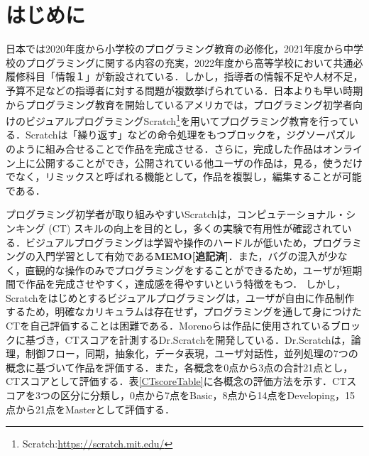 \documentclass[submit,techrep,noauthor]{ipsj}
\newcommand{\memo}[1]{\colorbox{magenta!30}{\textbf{MEMO}}{\color{red!50}\textbf{[#1]}}}
\begin{document}
\maketitle

\section{はじめに}

日本では2020年度から小学校のプログラミング教育の必修化，2021年度から中学校のプログラミングに関する内容の充実，2022年度から高等学校において共通必履修科目「情報１」が新設されている\cite{monkashou}．しかし，指導者の情報不足や人材不足，予算不足などの指導者に対する問題が複数挙げられている\cite{monkashou2}．日本よりも早い時期からプログラミング教育を開始しているアメリカでは，プログラミング初学者向けのビジュアルプログラミングScratch\footnote{Scratch:\url{https://scratch.mit.edu/}}\cite{resnick2009scratch}を用いてプログラミング教育を行っている．Scratchは「繰り返す」などの命令処理をもつブロックを，ジグソーパズルのように組み合せることで作品を完成させる．さらに，完成した作品はオンライン上に公開することができ，公開されている他ユーザの作品は，見る，使うだけでなく，リミックスと呼ばれる機能として，作品を複製し，編集することが可能である．

プログラミング初学者が取り組みやすいScratchは，コンピュテーショナル・シンキング (CT) \cite{wing2006computational}スキルの向上を目的とし，多くの実験で有用性が確認されている\cite{10.1145/2724660.2724674}\cite{hashitani2022scratch}\cite{10.1145/2818048.2819984}．ビジュアルプログラミングは学習や操作のハードルが低いため，プログラミングの入門学習として有効である\cite{1050845762811356288}\memo{追記済}．また，バグの混入が少なく，直観的な操作のみでプログラミングをすることができるため，ユーザが短期間で作品を完成させやすく，達成感を得やすいという特徴をもつ．
しかし，Scratchをはじめとするビジュアルプログラミングは，ユーザが自由に作品制作するため，明確なカリキュラムは存在せず，プログラミングを通して身につけたCTを自己評価することは困難である．Morenoらは作品に使用されているブロックに基づき，CTスコアを計測するDr.Scratchを開発している\cite{moreno2015dr}．Dr.Scratchは，論理，制御フロー，同期，抽象化，データ表現，ユーザ対話性，並列処理の7つの概念に基づいて作品を評価する．また，各概念を0点から3点の合計21点とし，CTスコアとして評価する．表\ref{CTscoreTable}に各概念の評価方法を示す．CTスコアを3つの区分に分類し，0点から7点をBasic，8点から14点をDeveloping，15点から21点をMasterとして評価する．
\end{document}
